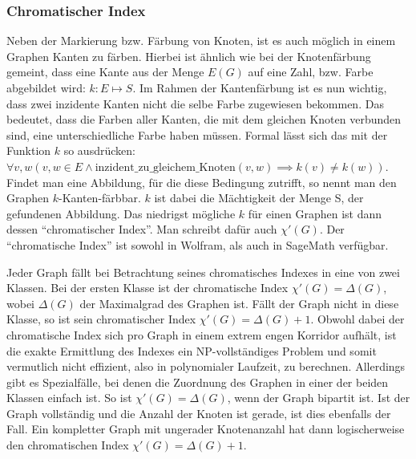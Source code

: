 \documentclass[a4paper,12pt,ngerman,chapterprefix=false,listof=totoc,bibliography=totoc]{scrreprt}
\begin{document}
\subsubsection*{Chromatischer Index}
{
Neben der Markierung bzw. Färbung von Knoten, ist es auch möglich in einem Graphen Kanten zu färben. Hierbei ist ähnlich wie bei der Knotenfärbung gemeint, dass eine Kante aus der Menge \(E(G)\) auf eine Zahl, bzw. Farbe abgebildet wird: \(k: E\mapsto S\). Im Rahmen der Kantenfärbung ist es nun wichtig, dass zwei inzidente Kanten nicht die selbe Farbe zugewiesen bekommen. Das bedeutet, dass die Farben aller Kanten, die mit dem gleichen Knoten verbunden sind, eine unterschiedliche Farbe haben müssen. Formal lässt sich das mit der Funktion \(k\) so ausdrücken: \(\forall v,w(v,w\in E \land \text{inzident}\_\text{zu}\_\text{gleichem}\_\text{Knoten}(v,w)\implies k(v)\neq k(w))\). Findet man eine Abbildung, für die diese Bedingung zutrifft, so nennt man den Graphen \(k\)-Kanten-färbbar. \(k\) ist dabei die Mächtigkeit der Menge S, der gefundenen Abbildung. Das niedrigst mögliche \(k\) für einen Graphen ist dann dessen "`chromatischer Index"'. Man schreibt dafür auch \(\chi '(G)\). Der "`chromatische Index"' ist sowohl in Wolfram, als auch in SageMath verfügbar. \cite{andersen_edge-colorings_1977,sagemath_graph_2020-1,wolfram_wolfram_2020-1}

Jeder Graph fällt bei Betrachtung seines chromatisches Indexes in eine von zwei Klassen. Bei der ersten Klasse ist der chromatische Index \(\chi '(G)=\Delta(G)\), wobei \(\Delta(G)\) der Maximalgrad des Graphen ist. Fällt der Graph nicht in diese Klasse, so ist sein chromatischer Index \(\chi '(G)=\Delta(G)+1\). Obwohl dabei der chromatische Index sich pro Graph in einem extrem engen Korridor aufhält, ist die exakte Ermittlung des Indexes ein NP-vollständiges Problem und somit vermutlich nicht effizient, also in polynomialer Laufzeit, zu berechnen. Allerdings gibt es Spezialfälle, bei denen die Zuordnung des Graphen in einer der beiden Klassen einfach ist. So ist \(\chi '(G)=\Delta(G)\), wenn der Graph bipartit ist. Ist der Graph vollständig und die Anzahl der Knoten ist gerade, ist dies ebenfalls der Fall. Ein kompletter Graph mit ungerader Knotenanzahl hat dann logischerweise den chromatischen Index \(\chi '(G)=\Delta(G)+1\). \cite{plantholt_chromatic_1983}

}
\end{document}
